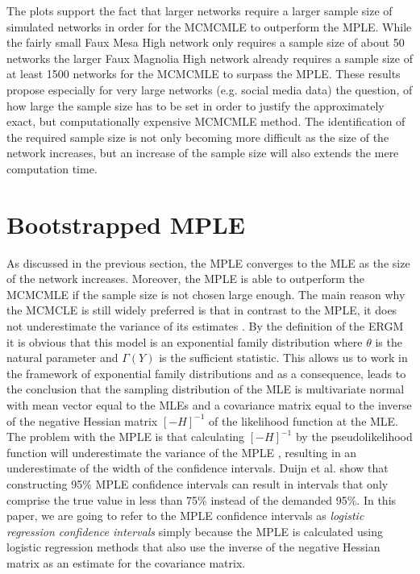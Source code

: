 \documentclass[headsepline=true, abstracton]{scrartcl}
\begin{document}
\noindent The plots support the fact that larger networks require a larger sample size of simulated networks in order for the MCMCMLE to outperform the MPLE. While the fairly small Faux Mesa High network only requires a sample size of about 50 networks the larger Faux Magnolia High network already requires a sample size of at least 1500 networks for the MCMCMLE to surpass the MPLE. These results propose especially for very large networks (e.g. social media data) the question, of how large the sample size has to be set in order to justify the approximately exact, but computationally expensive MCMCMLE method. The identification of the required sample size is not only becoming more difficult as the size of the network increases, but an increase of the sample size will also extends the mere computation time. 


\section*{Bootstrapped MPLE}
As discussed in the previous section, the MPLE converges to the MLE as the size of the network increases. Moreover, the MPLE is able to outperform the MCMCMLE if the sample size is not chosen large enough. The main reason why the MCMCLE is still widely preferred is that in contrast to the MPLE, it does not underestimate the variance of its estimates \cite{vanDuijnetal2009}. By the definition of the ERGM it is obvious that this model is an exponential family distribution where $\theta$ is the natural parameter and $\Gamma (Y)$ is the sufficient statistic. This allows us to work in the framework of exponential family distributions and as a consequence, leads to the conclusion that the sampling distribution of the MLE is multivariate normal with mean vector equal to the MLEs and a covariance matrix equal to the inverse of the negative Hessian matrix $[-H]^{-1}$ of the likelihood function at the MLE. The problem with the MPLE is that calculating $[-H]^{-1}$ by the pseudolikelihood function will underestimate the variance of the MPLE \cite{vanDuijnetal2009}, resulting in an underestimate of the width of the confidence intervals. Duijn et al. show that constructing 95\% MPLE confidence intervals can result in intervals that only comprise the true value in less than 75\% instead of the demanded 95\%. In this paper, we are going to refer to the MPLE confidence intervals as \textit{logistic regression confidence intervals} simply because the MPLE is calculated using logistic regression methods that also use the inverse of the negative Hessian matrix as an estimate for the covariance matrix. \\[0.3cm]
\end{document}

